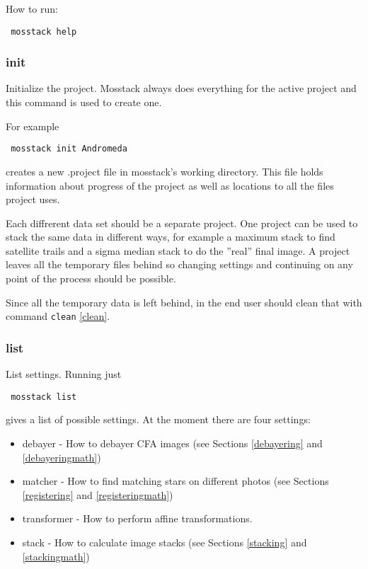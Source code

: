 \documentclass[twoside,a4paper]{refart}
\begin{document}
How to run: 

\begin{verbatim}
 mosstack help
\end{verbatim}



\subsubsection{init}
\label{init}

Initialize the project. Mosstack always does everything for the active project and this command is used to create
one.

For example

\begin{verbatim}
 mosstack init Andromeda
\end{verbatim}

creates a new .project file in mosstack's working directory. This file holds information about progress of the
project as well as locations to all the files project uses.

Each diffrerent data set should be a separate project. One project can be used to stack the same data in different
ways, for example a maximum stack to find satellite trails and a sigma median stack to do the ''real'' final image.
A project leaves all the temporary files behind so changing settings and continuing on any point of the process should
be possible.

Since all the temporary data is left behind, in the end user should clean that with command \texttt{clean} \ref{clean}.

\subsubsection{list}
\label{list}
List settings. Running just

\begin{verbatim}
 mosstack list
\end{verbatim}

gives a list of possible settings. At the moment there are four settings:
\begin{itemize}
 \item debayer - How to debayer CFA images (see Sections \ref{debayering} and \ref{debayeringmath})
 \item matcher - How to find matching stars on different photos (see Sections \ref{registering} and \ref{registeringmath})
 \item transformer - How to perform affine transformations.
 \item stack - How to calculate image stacks (see Sections \ref{stacking} and \ref{stackingmath})
\end{itemize}
\end{document}
